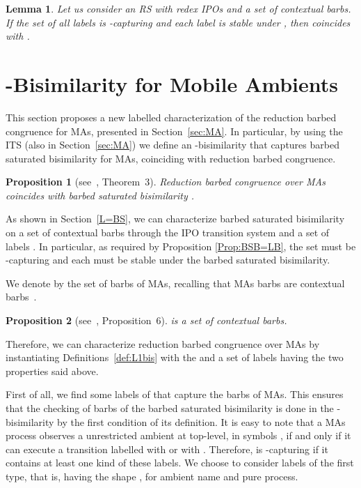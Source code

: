 \documentclass[copyright,creativecommons]{eptcs}
\newcommand{\<}{\langle}
\renewcommand{\>}{\rangle}
\newtheorem{lemma}{Lemma}{}
\newtheorem{proposition}{Proposition}{}
\begin{document}
\begin{lemma}
  Let us consider an RS with redex IPOs and a set  of contextual
  barbs. If the set of all labels is -capturing and each label is
  stable under , then  coincides with .
\end{lemma}



\section{-Bisimilarity for Mobile Ambients}\label{sec:LbisMA}
This section proposes a new labelled characterization of the
reduction barbed congruence for MAs, presented in Section~\ref{sec:MA}.
In particular, by using the ITS  (also
in Section~\ref{sec:MA}) we define an -bisimilarity
that captures barbed saturated bisimilarity for MAs,
coinciding with reduction barbed congruence.



\begin{proposition}[see~\cite{BGMFOSSACS09}, Theorem~3] 
\label{RBC=BSB}
  Reduction barbed congruence over MAs  coincides with
  barbed saturated bisimilarity .
\end{proposition}

As shown in Section~\ref{L=BS}, we can characterize barbed saturated bisimilarity
on a set of contextual barbs  through the IPO transition system and a set of labels .
In particular, as required by Proposition \ref{Prop:BSB=LB}, the set 
must be -capturing and each  must be stable under the barbed saturated bisimilarity.

We denote by  the set of barbs of MAs,
recalling that MAs barbs are contextual barbs~\cite{BGMFOSSACS09}.

\begin{proposition}[see~\cite{BGMFOSSACS09}, Proposition~6] 
  \label{MAsCB}
 is a set of contextual barbs.
\end{proposition}

Therefore, we can characterize reduction barbed congruence over MAs by instantiating
Definitions~\ref{def:L1bis} with the   and a set  of labels having the two properties
said above.

First of all, we find some labels of  that capture the barbs of MAs.
This ensures that the checking of barbs of the barbed saturated bisimilarity is
done in the -bisimilarity by the first condition of its definition.
It is easy to note that a MAs process  observes a unrestricted ambient  at top-level,
in symbols , if and only if it can execute a transition labelled with
 or with .
Therefore,  is -capturing if it contains at least one kind of these labels.
We choose to consider labels of the first type, that is, having
the shape  , for  ambient name and  pure process.
\end{document}
